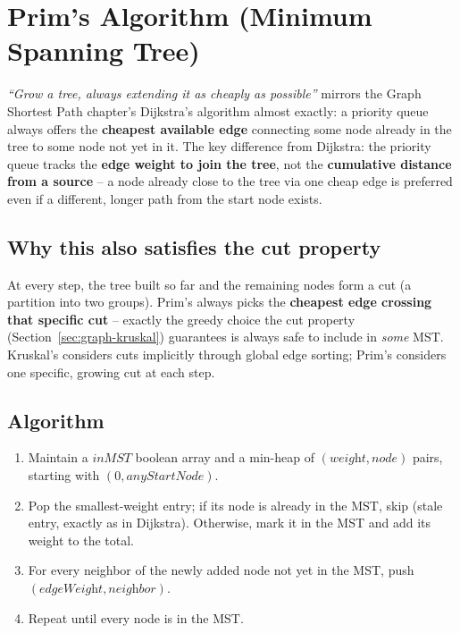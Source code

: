 \section{Prim's Algorithm (Minimum Spanning Tree)}
\label{sec:graph-prim}


\begin{patternbox}
\emph{``Grow a tree, always extending it as cheaply as possible''}
mirrors the Graph Shortest Path chapter's Dijkstra's algorithm almost exactly: a
priority queue always offers the \textbf{cheapest available edge}
connecting some node already in the tree to some node not yet in it.
The key difference from Dijkstra: the priority queue tracks the
\textbf{edge weight to join the tree}, not the \textbf{cumulative
distance from a source} -- a node already close to the tree via one
cheap edge is preferred even if a different, longer path from the
start node exists.
\end{patternbox}

\subsection*{Why this also satisfies the cut property}

At every step, the tree built so far and the remaining nodes form a
cut (a partition into two groups). Prim's always picks the
\textbf{cheapest edge crossing that specific cut} -- exactly the
greedy choice the cut property (Section~\ref{sec:graph-kruskal})
guarantees is always safe to include in \emph{some} MST. Kruskal's
considers cuts implicitly through global edge sorting; Prim's
considers one specific, growing cut at each step.

\subsection*{Algorithm}

\begin{enumerate}
  \item Maintain a $\textit{inMST}$ boolean array and a min-heap of
        $(\textit{weight}, \textit{node})$ pairs, starting with
        $(0, \textit{anyStartNode})$.
  \item Pop the smallest-weight entry; if its node is already in the
        MST, skip (stale entry, exactly as in Dijkstra). Otherwise,
        mark it in the MST and add its weight to the total.
  \item For every neighbor of the newly added node not yet in the
        MST, push $(\textit{edgeWeight}, \textit{neighbor})$.
  \item Repeat until every node is in the MST.
\end{enumerate}

